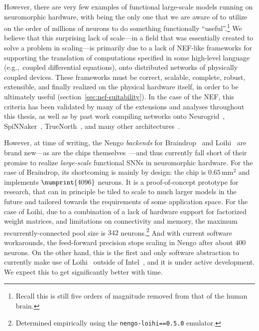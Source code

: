 However, there are very few examples of functional large-scale models running on neuromorphic hardware, with \citet{mundy2016real} being the only one that we are aware of to utilize on the order of millions of neurons to do something functionally ``useful''.\footnote{%
Recall this is still five orders of magnitude removed from that of the human brain.}
We believe that this surprising lack of scale---in a field that was essentially created to solve a problem in scaling---is primarily due to a lack of NEF-like frameworks for supporting the translation of computations specified in some high-level language (e.g.,~coupled differential equations), onto distributed networks of physically coupled devices.
These frameworks must be correct, scalable, complete, robust, extensible, and finally realized on the physical hardware itself, in order to be ultimately useful (section~\ref{sec:nef-suitability}).
In the case of the NEF, this criteria has been validated by many of the extensions and analyses throughout this thesis, as well as by past work compiling networks onto
Neurogrid~\citep{dethier2011brain},
SpiNNaker~\citep{mundy2015},
TrueNorth~\citep{fischl2018},
and many other architectures~\citep{naylor2013managing, bekolay2014, corradi2014, wang2014compact, berzish2016, wang2017neuromorphic, rasmussen2018nengodl, blouw2018a}.

However, at time of writing, the Nengo \emph{backends} for Braindrop~\citep{braindrop2019} and Loihi~\citep{nengoloihi} are brand new---as are the chips themselves~\citep{neckar2018braindrop, davies2018loihi}---and thus currently fall short of their promise to realize \emph{large-scale} functional SNNs in neuromorphic hardware.
For the case of Braindrop, its shortcoming is mainly by design: the chip is $0.65$\,mm${}^2$ and implements $\numprint{4096}$ neurons.
It is a proof-of-concept prototype for research, that can in principle be tiled to scale to much larger models in the future and tailored towards the requirements of some application space.
For the case of Loihi, due to a combination of a lack of hardware support for factorized weight matrices, and limitations on connectivity and memory, the maximum recurrently-connected pool size is $342$ neurons.\footnote{%
Determined empirically using the \texttt{nengo-loihi==0.5.0} emulator.}
And with current software workarounds, the feed-forward precision stops scaling in Nengo after about $400$ neurons.
On the other hand, this is the first and only software abstraction to currently make use of Loihi~\citep{blouw2018a} outside of Intel~\citep{lin2018mapping}, and it is under active development.
We expect this to get significantly better with time.

